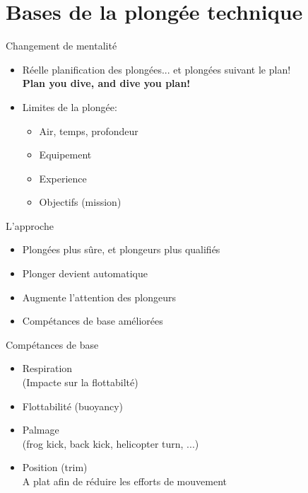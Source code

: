 
\section{Bases de la plongée technique}

\begin{frame}{Changement de mentalité}
	\begin{itemize}
		\item Réelle planification des plongées... et plongées suivant le plan!\\\textbf{Plan you dive, 	and dive you plan!}
		\item Limites de la plongée:
		\begin{itemize}
			\item Air, temps, profondeur
			\item Equipement
			\item Experience
			\item Objectifs (mission)
		\end{itemize} 
	\end{itemize}
\end{frame}

\begin{frame}{L'approche}  
	\begin{itemize}
		\item Plongées plus sûre, et plongeurs plus qualifiés
		\item Plonger devient automatique
		\item Augmente l'attention des plongeurs
		\item Compétances de base améliorées
	\end{itemize}
\end{frame}

\begin{frame}{Compétances de base}
	\begin{itemize}
		\item Respiration\\(Impacte sur la flottabilté)
		\item Flottabilité (buoyancy)
		\item Palmage\\(frog kick, back kick, helicopter turn, ...)
		\item Position (trim)\\ A plat afin de réduire les efforts de mouvement
	\end{itemize}
\end{frame}


